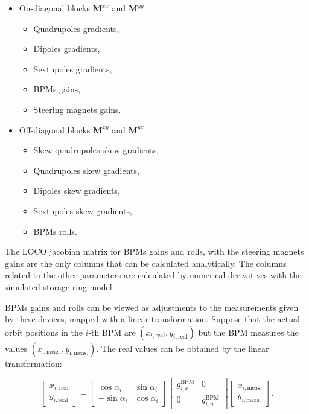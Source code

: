 \begin{itemize}
    \item On-diagonal blocks $\mathbf{M}^{xx}$ and $\mathbf{M}^{yy}$

    \begin{itemize}
        \item Quadrupoles gradients,
        \item Dipoles gradients,
        \item Sextupoles gradients,
        \item BPMs gains,
        \item Steering magnets gains.
    \end{itemize}
    
    \item Off-diagonal blocks $\mathbf{M}^{xy}$ and $\mathbf{M}^{yx}$
    
    \begin{itemize}
        \item Skew quadrupoles skew gradients,
        \item Quadrupoles skew gradients,
        \item Dipoles skew gradients,
        \item Sextupoles skew gradients,
        \item BPMs rolls.
    \end{itemize}
\end{itemize}

The LOCO jacobian matrix for BPMs gains and rolls, with the steering magnets gains are the only columns that can be calculated analytically. The columns related to the other parameters are calculated by numerical derivatives with the simulated storage ring model. 

BPMs gains and rolls can be viewed as adjustments to the measurements given by these devices, mapped with a linear transformation. Suppose that the actual orbit positions in the $i$-th BPM are $(x_{i, \mathrm{real}}, y_{i, \mathrm{real}})$ but the BPM measures the values $(x_{\mathrm{i, meas.}}, y_{\mathrm{i, meas.}})$. The real values can be obtained by the linear transformation:

\begin{equation}
    \begin{bmatrix}
      x_{i, \mathrm{real}} \\
      y_{i, \mathrm{real}}
\end{bmatrix} = \begin{bmatrix}
     \cos\alpha_i & \sin\alpha_i \\
     -\sin\alpha_i & \cos\alpha_i
 \end{bmatrix} \begin{bmatrix}
     g_{i, x}^{\mathrm{BPM}} & 0 \\
     0 & g_{i, y}^{\mathrm{BPM}}
 \end{bmatrix}
 \begin{bmatrix}
      x_{i, \mathrm{meas.}} \\
      y_{i, \mathrm{meas.}}
\end{bmatrix}.
\label{eq:bpm_gain1}
\end{equation}

